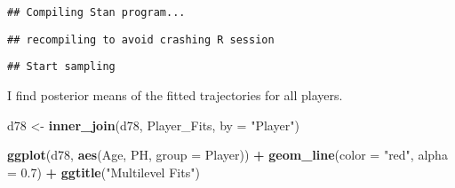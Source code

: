 \documentclass[
]{book}
\newenvironment{Shaded}{\begin{snugshade}}{\end{snugshade}}
\newcommand{\DataTypeTok}[1]{\textcolor[rgb]{0.13,0.29,0.53}{#1}}
\newcommand{\DecValTok}[1]{\textcolor[rgb]{0.00,0.00,0.81}{#1}}
\newcommand{\FloatTok}[1]{\textcolor[rgb]{0.00,0.00,0.81}{#1}}
\newcommand{\KeywordTok}[1]{\textcolor[rgb]{0.13,0.29,0.53}{\textbf{#1}}}
\newcommand{\NormalTok}[1]{#1}
\newcommand{\OperatorTok}[1]{\textcolor[rgb]{0.81,0.36,0.00}{\textbf{#1}}}
\newcommand{\StringTok}[1]{\textcolor[rgb]{0.31,0.60,0.02}{#1}}
\begin{document}
\begin{verbatim}
## Compiling Stan program...
\end{verbatim}

\begin{verbatim}
## recompiling to avoid crashing R session
\end{verbatim}

\begin{verbatim}
## Start sampling
\end{verbatim}

I find posterior means of the fitted trajectories for all players.

\begin{Shaded}
\end{Shaded}

\begin{Shaded}
\begin{Highlighting}[]
\NormalTok{d78 <-}\StringTok{ }\KeywordTok{inner_join}\NormalTok{(d78, Player_Fits, }\DataTypeTok{by =} \StringTok{"Player"}\NormalTok{)}
\end{Highlighting}
\end{Shaded}

\begin{Shaded}
\end{Shaded}

\begin{Shaded}
\begin{Highlighting}[]
\KeywordTok{ggplot}\NormalTok{(d78, }\KeywordTok{aes}\NormalTok{(Age, PH, }\DataTypeTok{group =}\NormalTok{ Player)) }\OperatorTok{+}
\StringTok{  }\KeywordTok{geom_line}\NormalTok{(}\DataTypeTok{color =} \StringTok{"red"}\NormalTok{, }\DataTypeTok{alpha =} \FloatTok{0.7}\NormalTok{) }\OperatorTok{+}
\StringTok{  }\KeywordTok{ggtitle}\NormalTok{(}\StringTok{"Multilevel Fits"}\NormalTok{) }
\end{Highlighting}
\end{Shaded}
\end{document}
